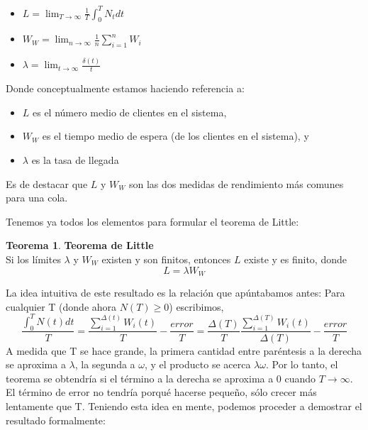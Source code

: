 \documentclass[a4paper,10pt]{scrartcl}
\theoremstyle{definition}
\newtheorem*{theorem*}{Teorema}
\numberwithin{equation}{section}
\begin{document}
\begin{itemize}
 \item $L = \lim_{T\to \infty}\frac{1}{T} \int_{0}^{T} N_t dt$
 \item $W_W = \lim_{n\to \infty}\frac{1}{n} \sum_{i=1}^{n} W_i$
 \item $\lambda = \lim_{t\to \infty}\frac{\delta(t)}{t}$
\end{itemize}

Donde conceptualmente estamos haciendo referencia a:
\begin{itemize}
 \item $L$ es el número medio de clientes en el sistema,
 \item $W_W$ es el tiempo medio de espera (de los clientes en el sistema), y
 \item $\lambda$ es la tasa de llegada 
\end{itemize}
Es de destacar que  $L$ y $W_W$ son las dos medidas de rendimiento más comunes para una cola.


Tenemos ya todos los elementos para formular el teorema de Little:
\begin{theorem*}{\textbf{Teorema de Little}}\\
Si los límites $\lambda$ y $W_W$ existen y son finitos, entonces $L$ existe y es finito, donde 
\[L = \lambda W_W\]
\end{theorem*}

La idea intuitiva de este resultado es la relación que apúntabamos antes: Para cualquier T (donde ahora $N (T) \geq 0$) escribimos,
\[ \frac{\int_{0}^{T} N(t)dt}{T}=\frac{\sum_{i=1}^{\Delta (t)} W_i(t)}{T}-\frac{error}{T}=\frac{\Delta(T)}{T}\frac{\sum_{i=1}^{\Delta (T)} W_i(t)}{\Delta(T)}-\frac{error}{T}   \]
A medida que T se hace grande, la primera cantidad entre paréntesis a la derecha se aproxima a $\lambda$, la segunda a $\omega$, y el producto se acerca $\lambda\omega$. Por lo tanto, el teorema se obtendría si el término a la derecha se aproxima a 0 cuando $T\rightarrow\infty$. El término de error no tendría porqué hacerse pequeño, sólo crecer más lentamente que T.
Teniendo esta idea en mente, podemos proceder a demostrar el resultado formalmente:
\end{document}
